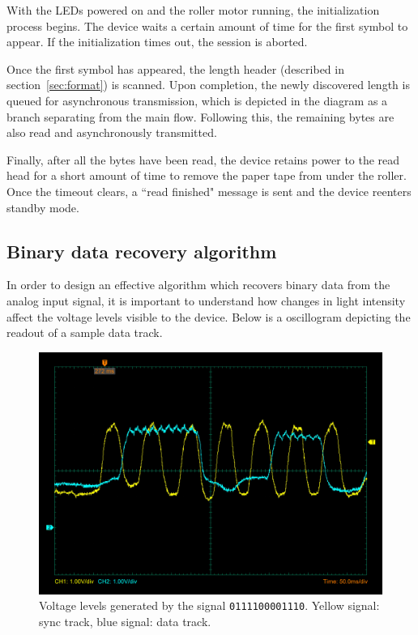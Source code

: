 \documentclass{article}
\begin{document}
	With the LEDs powered on and the roller motor running, the initialization
	process begins. The device waits a certain amount of time for the first
	symbol to appear. If the initialization times out, the session is aborted.
	
	Once the first symbol has appeared, the length header (described in
	section~\ref{sec:format}) is scanned. Upon completion, the newly discovered
	length is queued for asynchronous transmission, which is depicted in the
	diagram as a branch separating from the main flow. Following this, the
	remaining bytes are also read and asynchronously transmitted.
	
	Finally, after all the bytes have been read, the device retains power to
	the read head for a short amount of time to remove the paper tape from
	under the roller. Once the timeout clears, a ``read finished" message is
	sent and the device reenters standby mode.
	
	\subsection{Binary data recovery algorithm}
	\label{sec:readalg}
	
	In order to design an effective algorithm which recovers binary data from
	the analog input signal, it is important to understand how changes in light
	intensity affect the voltage levels visible to the device. Below is a
	oscillogram depicting the readout of a sample data track.
	
	\clearpage
	
	\begin{figure}[h]
		\begin{center}
			\includegraphics[width=0.6\linewidth]{img/osc1}
			\caption{Voltage levels generated by the signal
			\texttt{0111100001110}. Yellow signal: sync track, blue signal:
			data track.}
		\end{center}
	\end{figure}
	
\end{document}
